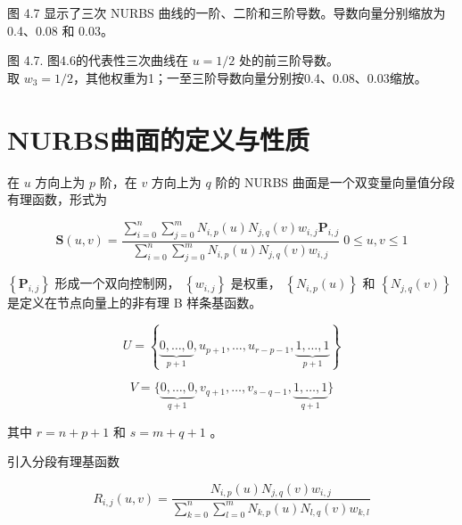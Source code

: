 \documentclass[../main.tex]{subfiles}
\begin{document}
图 4.7 显示了三次 NURBS 曲线的一阶、二阶和三阶导数。导数向量分别缩放为 0.4、0.08 和 0.03。

\begin{center}
\begin{minipage}{18cm}
\vspace*{.6\baselineskip}
\centering
{}
\par\smallskip
图 4.7. 图4.6的代表性三次曲线在 \(u=1/2\) 处的前三阶导数。\\ 取 \(w_3=1/2\)，其他权重为1；一至三阶导数向量分别按0.4、0.08、0.03缩放。
\end{minipage}
\end{center}





\section{NURBS曲面的定义与性质}

在 \(u\) 方向上为 \(p\) 阶，在 \(v\) 方向上为 \(q\) 阶的 NURBS 曲面是一个双变量向量值分段有理函数，形式为

\[
\mathbf{S}\left( {u,v}\right)  = \frac{\mathop{\sum }\limits_{{i = 0}}^{n}\mathop{\sum }\limits_{{j = 0}}^{m}{N}_{i,p}\left( u\right) {N}_{j,q}\left( v\right) {w}_{i,j}{\mathbf{P}}_{i,j}}{\mathop{\sum }\limits_{{i = 0}}^{n}\mathop{\sum }\limits_{{j = 0}}^{m}{N}_{i,p}\left( u\right) {N}_{j,q}\left( v\right) {w}_{i,j}}\;0 \leq  u,v \leq  1 \tag{4.11}
\]

\(\left\{  {\mathbf{P}}_{i,j}\right\}\) 形成一个双向控制网， \(\left\{  {w}_{i,j}\right\}\) 是权重， \(\left\{  {{N}_{i,p}\left( u\right) }\right\}\) 和 \(\left\{  {{N}_{j,q}\left( v\right) }\right\}\) 是定义在节点向量上的非有理 B 样条基函数。

\[
U = \left\{  {\underset{p + 1}{\underbrace{0,\ldots ,0}},{u}_{p + 1},\ldots ,{u}_{r - p - 1},\underset{p + 1}{\underbrace{1,\ldots ,1}}}\right\}
\]

\[
V = \{ \underset{q + 1}{\underbrace{0,\ldots ,0}},{v}_{q + 1},\ldots ,{v}_{s - q - 1},\underset{q + 1}{\underbrace{1,\ldots ,1}}\}
\]

其中 \(r = n + p + 1\) 和 \(s = m + q + 1\) 。

引入分段有理基函数

\[
{R}_{i,j}\left( {u,v}\right)  = \frac{{N}_{i,p}\left( u\right) {N}_{j,q}\left( v\right) {w}_{i,j}}{\mathop{\sum }\limits_{{k = 0}}^{n}\mathop{\sum }\limits_{{l = 0}}^{m}{N}_{k,p}\left( u\right) {N}_{l,q}\left( v\right) {w}_{k,l}} \tag{4.12}
\]
\end{document}
